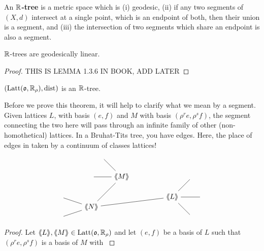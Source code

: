 \documentclass[draft]{amsart}
\DeclareMathOperator{\dist}{dist}
\DeclareMathOperator{\lat}{Latt}
\newcommand{\latt}{\lat(\mathfrak o,\R_\rho)}
\newcommand{\llangle}{\langle \hspace{-.25em}\langle}
\newcommand{\rrangle}{\rangle \hspace{-.25em}\rangle}
\begin{document}
\begin{defn}
    An \(\mathbb{R}\)\textbf{-tree} is a metric space which is (i) geodesic, (ii) if any two segments of \((X,d)\) intersect at a single point, which is an endpoint of both, then their union is a segment, and (iii) the intersection of two segments which share an endpoint is also a segment.
\end{defn}

\begin{prop}
    \(\mathbb{R}\)-trees are geodesically linear.
\end{prop}
\begin{proof}
 THIS IS LEMMA 1.3.6 IN BOOK, ADD LATER
\end{proof}

\begin{thm}
    \((\latt,\dist )\) is an \(\mathbb{R}\)-tree.
\end{thm}
Before we prove this theorem, it will help to clarify what we mean by a segment. Given lattices \(L\), with basis \((e,f)\) and \(M\) with basis \((\rho^r e, \rho^s f)\), the segment connecting the two here will pass through an infinite family of other (non-homothetical) lattices. In a Bruhat-Tits tree, you have edges. Here, the place of edges in taken by a continuum of classes lattices!
\[
\begin{tikzpicture}
  \node (M) at (0,0) {\(\llangle M\rrangle\)};
  \node (L) at (2.5,-1) {\(\llangle L\rrangle\)};
  \node (N) at (-1.5,-1.5) {\(\llangle N\rrangle\)};

  \node (M1) at (-1,1) {};
  \node (M2) at (-1.5,0) {};

  \node (L1) at (3.5,-2) {};
  \node (L2) at (4,-1) {};
  \node (L3) at (3.5,0) {};

  \node (N1) at (-3,-1) {};
  \node (N2) at (-3,-2) {};
  


  \draw (M) -- (M1);
  \draw (M) -- (M2);
  \draw (M) -- (N);
  \draw (N) -- (L);
  \draw (N) -- (N1);
  \draw (N) -- (N2);
  \draw (L) -- (L1);
  \draw (L) -- (L2);
  \draw (L) -- (L3);
\end{tikzpicture}
\]

\begin{proof}
    Let \(\llangle L \rrangle , \llangle M \rrangle \in \latt\) and let \((e,f)\) be a basis of \(L\) such that \((\rho^r e, \rho^s f)\) is a basis of \(M\) with \(\)
\end{proof}
\end{document}
